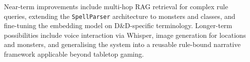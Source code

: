 \documentclass[12pt,a4paper]{article}
\begin{document}
Near-term improvements include multi-hop RAG retrieval for complex rule
queries, extending the \texttt{SpellParser} architecture to monsters and
classes, and fine-tuning the embedding model on D\&D-specific terminology.
Longer-term possibilities include voice interaction via Whisper, image
generation for locations and monsters, and generalising the system into a
reusable rule-bound narrative framework applicable beyond tabletop gaming.

\newpage
\printbibliography[heading=bibintoc,title={References}]
\end{document}
